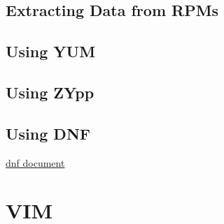 \documentclass{book}
\begin{document}
	\subsection{Extracting Data from RPMs}
	\subsection{Using YUM}
	\subsection{Using ZYpp}
	\subsection{Using DNF}
		\href{https://dnf.readthedocs.io/en/latest/use\_cases.html}{dnf document}
	
	\section{VIM}
\end{document}
